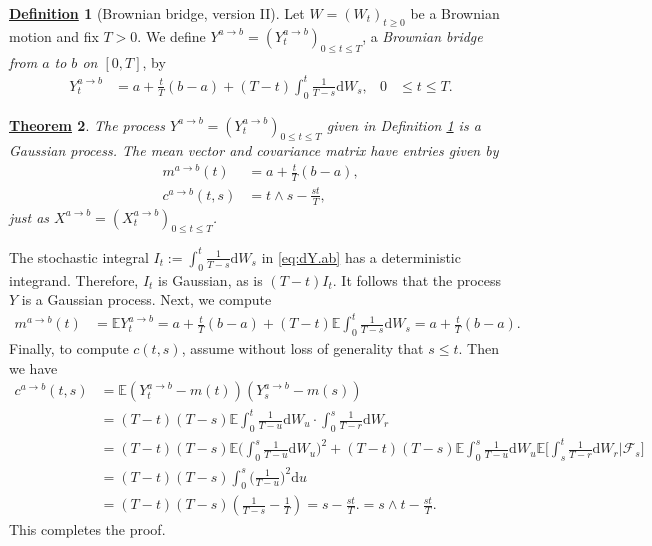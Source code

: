 \documentclass[12pt]{book}
\numberwithin{equation}{chapter}
\theoremstyle{plain}
\newtheorem{theorem}{\underline{Theorem}}
\numberwithin{theorem}{section}
\theoremstyle{definition}
\newtheorem{definition}[theorem]{\underline{Definition}}
\numberwithin{exercise}{chapter}
\let\oldendproof\endproof
\renewenvironment{proof}[1][\proofname]{%
  \oldproof[\scshape\underline{#1}]%
}{\oldendproof}
\newcommand{\<}{\langle}
\renewcommand{\>}{\rangle}
\renewcommand{\(}{\left(}
\renewcommand{\)}{\right)}
\renewcommand{\[}{\left[}
\renewcommand{\]}{\right]}
\newcommand\Eb{\mathds{E}}
\newcommand\Fc{\mathscr{F}}
\newcommand\dd{\mathrm{d}}
\begin{document}
\begin{definition}[Brownian bridge, version II]
\label{def:bridge.bm.2}
Let $W=(W_t)_{t \geq 0}$ be a Brownian motion and fix $T>0$.  We define $Y^{a \to b} = (Y_t^{a \to b})_{0 \leq t \leq T}$, a \emph{Brownian bridge from $a$ to $b$ on $[0,T]$}, by
\begin{align}
Y_t^{a \to b}
	&=	a + \frac{t}{T}(b-a) + (T-t) \int_0^t \frac{1}{T-s} \dd W_s , &
0
	&\leq t \leq T . \label{eq:dY.ab}
\end{align}
\end{definition}

\begin{theorem}
The process $Y^{a \to b} = (Y_t^{a \to b})_{0 \leq t \leq T}$ given in Definition \ref{def:bridge.bm.2} is a Gaussian process.  The mean vector and covariance matrix have entries given by
\begin{align}
m^{a \to b}(t)
	&=	a + \frac{t}{T}(b-a) , \\
c^{a \to b}(t,s)
	&=	t \wedge s - \frac{s t}{T} ,
\end{align}
just as $X^{a \to b} = (X_t^{a \to b})_{0 \leq t \leq T}$.
\end{theorem}

\begin{proof}
The stochastic integral $I_t:=\int_0^t \frac{1}{T-s} \dd W_s$ in \eqref{eq:dY.ab} has a deterministic integrand.  Therefore, $I_t$ is Gaussian, as is $(T-t)I_t$.  It follows that the process $Y$ is a Gaussian process.  Next, we compute
\begin{align}
m^{a \to b}(t)
	&=	\Eb Y_t^{a \to b} 
	=		a + \frac{t}{T}(b-a) + (T-t)  \Eb \int_0^t \frac{1}{T-s} \dd W_s
	=		a + \frac{t}{T}(b-a) .
\end{align}
Finally, to compute $c(t,s)$, assume without loss of generality that $s \leq t$.  Then we have
\begin{align}
c^{a \to b}(t,s)
	&=	\Eb \( Y_t^{a \to b}- m(t) \) \( Y_s^{a \to b}- m(s) \) \\
	&=	(T-t)(T-s) \Eb \int_0^t \frac{1}{T-u} \dd W_u \cdot \int_0^s \frac{1}{T-r} \dd W_r \\
	&=	(T-t)(T-s) \Eb \Big( \int_0^s \frac{1}{T-u} \dd W_u \Big)^2
			+ (T-t)(T-s) \Eb \int_0^s \frac{1}{T-u} \dd W_u \Eb \Big[ \int_s^t \frac{1}{T-r} \dd W_r \Big | \Fc_s \Big] \\
	&=	(T-t)(T-s) \int_0^s \Big( \frac{1}{T-u} \Big)^2 \dd u  \\
	&=	(T-t)(T-s) \( \frac{1}{T-s} - \frac{1}{T} \) 
	=		s - \frac{st}{T} .
	=		s \wedge t - \frac{st}{T} .
\end{align}
This completes the proof.
\end{proof}
\end{document}
